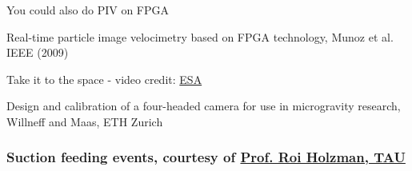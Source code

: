     
%    
%    
    \begin{frame}[label=app-110a]{You could also do PIV on FPGA}
    \begin{cardTiny}
    Real-time particle image velocimetry based on FPGA technology, Munoz et al. IEEE (2009)
    \end{cardTiny}
    \end{frame}
%    
%    
\begin{frame}[label=app-11a]{Take it to the space - video credit: \href{https://www.dropbox.com/s/59ophf177gcfjzq/boiling_microgravity.mp4?raw=1}{ESA}}
    \begin{cardTiny}
    Design and calibration of a four-headed camera for use in microgravity research, Willneff and Maas, ETH Zurich
    \end{cardTiny}
\end{frame}
    

\begin{frame}[label=app-1]
    \frametitle{Suction feeding events, courtesy of \href{https://www.dropbox.com/s/wcytdkxuxxvn4q0/fish_feeding.mp4?raw=1}{Prof. Roi Holzman, TAU}}
\end{frame}
    
